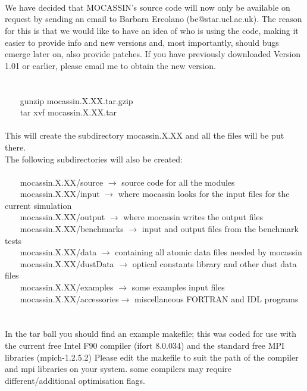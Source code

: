 \documentclass[11pt]{article}
\begin{document}
\\
\\
\\
   We have decided that MOCASSIN's source code will now only be available on
   request by sending an email to Barbara Ercolano (be@star.ucl.ac.uk). The 
   reason for this is that we would like to have an idea of who is using the
   code, making it easier to provide info and new versions and, most importantly,
   should bugs emerge later on, also provide patches. If you have previously 
   downloaded Version 1.01 or earlier, please email me to obtain the new version. \\
\\   
\\
\noindent ~~~    gunzip mocassin.X.XX.tar.gzip\\
\noindent ~~~    tar xvf mocassin.X.XX.tar\\
\\
   This will create the subdirectory mocassin.X.XX and all the files will be put 
   there.\\
   The following subdirectories will also be created:\\
\\
\noindent ~~~    mocassin.X.XX/source     $\rightarrow$ source code for all the modules\\
\noindent ~~~    mocassin.X.XX/input      $\rightarrow$ where mocassin looks for the input files for the 
                               current simulation \\
\noindent ~~~    mocassin.X.XX/output     $\rightarrow$ where mocassin writes the output files \\
\noindent ~~~    mocassin.X.XX/benchmarks $\rightarrow$ input and output files from the benchmark tests \\
\noindent ~~~    mocassin.X.XX/data       $\rightarrow$ containing all atomic data files needed by mocassin \\
\noindent ~~~    mocassin.X.XX/dustData   $\rightarrow$ optical constants library and other dust data files \\
\noindent ~~~    mocassin.X.XX/examples   $\rightarrow$ some examples input files\\
\noindent ~~~    mocassin.X.XX/accessories$\rightarrow$ miscellaneous FORTRAN and IDL programs\\
\\
\\
   In the tar ball you should find an example makefile;
   this was coded for use with the current free Intel F90 compiler 
   (ifort 8.0.034) and the standard free MPI libraries (mpich-1.2.5.2)
   Please edit the makefile to suit the path of the  compiler and mpi libraries on
   your system. some compilers may require different/additional optimisation flags.   \\
\end{document}
